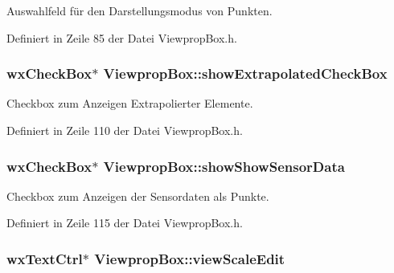 Auswahlfeld für den Darstellungsmodus von Punkten. 



Definiert in Zeile 85 der Datei Viewprop\-Box.\-h.

\hypertarget{classViewpropBox_a26459f6ab8498b578ecf30dcb4fd582e}{
\subsubsection[{show\-Extrapolated\-Check\-Box}]{\setlength{\rightskip}{0pt plus 5cm}wx\-Check\-Box$\ast$ Viewprop\-Box\-::show\-Extrapolated\-Check\-Box\hspace{0.3cm}{\ttfamily [private]}}}\label{classViewpropBox_a26459f6ab8498b578ecf30dcb4fd582e}


Checkbox zum Anzeigen Extrapolierter Elemente. 



Definiert in Zeile 110 der Datei Viewprop\-Box.\-h.

\hypertarget{classViewpropBox_a731fabc531998315b0850a3b60eb3c51}{
\subsubsection[{show\-Show\-Sensor\-Data}]{\setlength{\rightskip}{0pt plus 5cm}wx\-Check\-Box$\ast$ Viewprop\-Box\-::show\-Show\-Sensor\-Data\hspace{0.3cm}{\ttfamily [private]}}}\label{classViewpropBox_a731fabc531998315b0850a3b60eb3c51}


Checkbox zum Anzeigen der Sensordaten als Punkte. 



Definiert in Zeile 115 der Datei Viewprop\-Box.\-h.

\hypertarget{classViewpropBox_ae275307ddd3a84c91298e78b826f1ae1}{
\subsubsection[{view\-Scale\-Edit}]{\setlength{\rightskip}{0pt plus 5cm}wx\-Text\-Ctrl$\ast$ Viewprop\-Box\-::view\-Scale\-Edit\hspace{0.3cm}{\ttfamily [private]}}}\label{classViewpropBox_ae275307ddd3a84c91298e78b826f1ae1}


